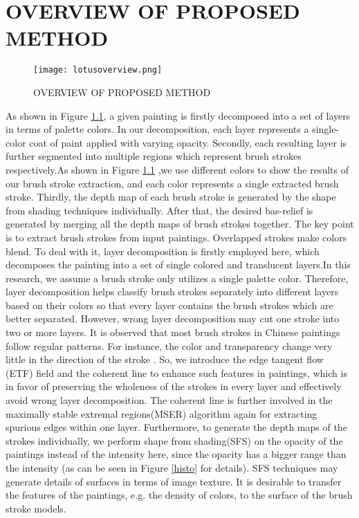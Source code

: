 \chapter{OVERVIEW OF PROPOSED METHOD} 

\begin{figure}
\centering
\texttt{[image: lotusoverview.png]}
\caption{ OVERVIEW OF PROPOSED METHOD}
\label{decom:overview}
\end{figure}
As shown in Figure \ref{decom:overview}, a given painting is firstly decomposed into a set of layers in terms of palette colors. In our decomposition, each layer represents a single-color coat of paint applied with varying opacity. Secondly, each resulting layer is further segmented into multiple regions which represent brush strokes respectively.As shown in Figure \ref{decom:overview} ,we use different colors to show the results of our brush stroke extraction, and each color represents a single extracted brush stroke. Thirdly, the depth map of each brush stroke is generated by the shape from shading techniques individually. After that, the desired bas-relief is generated by merging all the depth maps of brush strokes together.
\newline
The key point is to extract brush strokes from input paintings. Overlapped strokes make colors blend. To deal with it, layer decomposition is firstly employed here, which decomposes the painting into a set of single colored and translucent layers.In this research, we assume a brush stroke only utilizes a single palette color. Therefore, layer decomposition helps classify brush strokes separately into different layers based on their colors so that every layer contains the brush strokes which are better separated.
However, wrong layer decomposition may cut one stroke into two or more layers. It is observed that most brush strokes in Chinese paintings follow regular patterns. For instance, the color and transparency change very little in the direction of the stroke \cite{xu2006animating}. So, we introduce the edge tangent flow (ETF) field and the coherent line \cite{kang2007coherent} to enhance such features in paintings, which is in favor of preserving the wholeness of the strokes in every layer and effectively avoid wrong layer decomposition.
\newline
The coherent line is further involved in the maximally stable extremal regions(MSER) algorithm \cite{donoser2006efficient} again for extracting spurious edges within one layer.
Furthermore, to generate the depth maps of the strokes individually, we perform shape from shading(SFS) on the opacity of the paintings instead of the intensity here, since the opacity has a bigger range than the intensity (as can be seen in Figure \ref{histo} for details). SFS techniques may generate details of surfaces in terms of image texture. It is desirable to transfer the features of the paintings, e.g. the density of colors, to the surface of the brush stroke models.
